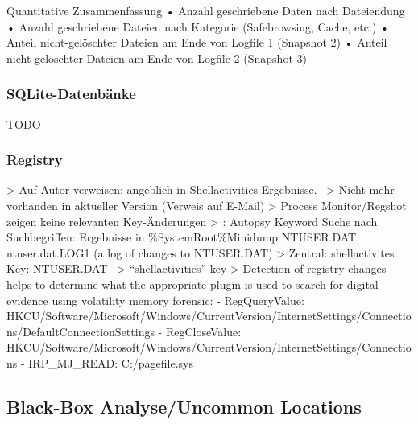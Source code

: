 Quantitative Zusammenfassung
	•	Anzahl geschriebene Daten nach Dateiendung
	•	Anzahl geschriebene Dateien nach Kategorie (Safebrowsing, Cache, etc.)
	•	Anteil nicht-gelöschter Dateien am Ende von Logfile 1 (Snapshot 2)
	•	Anteil nicht-gelöschter Dateien am Ende von Logfile 2 (Snapshot 3)

\subsubsection*{SQLite-Datenbänke}
	TODO

\subsubsection*{Registry}
>	Auf Autor verweisen: angeblich in Shellactivities Ergebnisse. --> Nicht mehr vorhanden in aktueller Version (Verweis auf E-Mail)
>	Process Monitor/Regshot zeigen keine relevanten Key-Änderungen
> \cite{Muir.2019}: Autopsy Keyword Suche nach Suchbegriffen: Ergebnisse in \%SystemRoot\%Minidump NTUSER.DAT, ntuser.dat.LOG1 (a log of changes to NTUSER.DAT)
> Zentral: shellactivites Key:	NTUSER.DAT --> “shellactivities” key \cite{Muir.2019}
> \cite{Rochmadi.2017} Detection of registry changes helps to determine what the appropriate plugin is used to search for digital evidence using volatility memory forensic:
- RegQueryValue:	HKCU/Software/Microsoft/Windows/CurrentVersion/InternetSettings/Connections/DefaultConnectionSettings
- RegCloseValue: 	HKCU/Software/Microsoft/Windows/CurrentVersion/InternetSettings/Connections
- IRP\_MJ\_READ: C:/pagefile.sys


\subsection*{Black-Box Analyse/Uncommon Locations}

